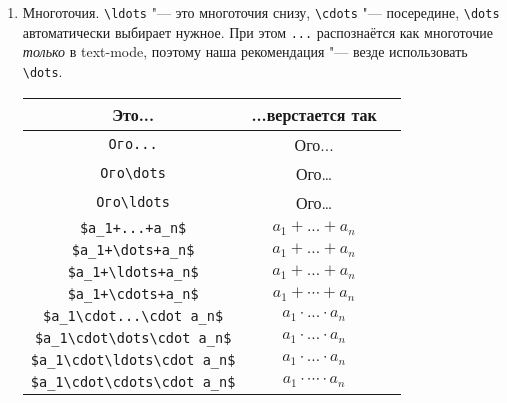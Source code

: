 \begin{enumerate}
\item
	Многоточия.
	\verb!\ldots! "--- это многоточия снизу, \verb!\cdots! "--- посередине, \verb!\dots! автоматически выбирает нужное.
	При этом \verb!...! распознаётся как многоточие \textit{только} в text-mode, 
	поэтому наша рекомендация "--- везде использовать \verb!\dots!.
	\begin{center}\begin{tabular}{|c|c|c|}
		\hline Это... & ...верстается так & \\
		\hline \verb!Ого...! & Ого... \ok \\
		\hline \verb!Ого\dots! & Ого\dots \ok \\
		\hline \verb!Ого\ldots! & Ого\ldots \ok \\
		\hline \verb!$a_1+...+a_n$! & $a_1+...+a_n$ \bad \\
		\hline \verb!$a_1+\dots+a_n$! & $a_1+\dots+a_n$ \ok \\
		\hline \verb!$a_1+\ldots+a_n$! & $a_1+\ldots+a_n$ \bad \\
		\hline \verb!$a_1+\cdots+a_n$! & $a_1+\cdots+a_n$ \ok \\
		\hline \verb!$a_1\cdot...\cdot a_n$! & $a_1\cdot ... \cdot a_n$ \bad \\
		\hline \verb!$a_1\cdot\dots\cdot a_n$! & $a_1\cdot\dots\cdot a_n$ \ok \\
		\hline \verb!$a_1\cdot\ldots\cdot a_n$! & $a_1\cdot\ldots\cdot a_n$ \ok \\
		\hline \verb!$a_1\cdot\cdots\cdot a_n$! & $a_1\cdot\cdots\cdot a_n$ \bad \\
		\hline
	\end{tabular}\end{center}


\end{enumerate}
